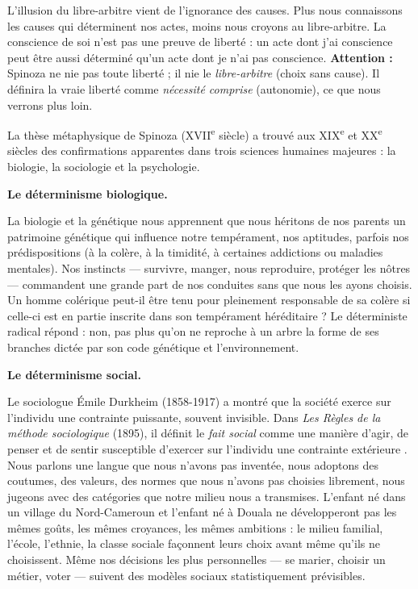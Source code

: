 \documentclass[11pt]{article}
\newcounter{popsec}
\newcounter{popsub}
\newcommand{\courssub}[1]{%
  \stepcounter{popsub}%
  \par\vspace{9pt}\noindent{\popxbold\fontsize{11.5}{13}\selectfont\color{popink}{\color{poporange}\thepopsec.\thepopsub}\hspace{6pt}#1}\par\nopagebreak\vspace{4pt}
}
\begin{document}
\begin{aretenir}
L'illusion du libre-arbitre vient de l'ignorance des causes. Plus nous connaissons les causes qui déterminent nos actes, moins nous croyons au libre-arbitre. La conscience de soi n'est pas une preuve de liberté : un acte dont j'ai conscience peut être aussi déterminé qu'un acte dont je n'ai pas conscience. \textbf{Attention :} Spinoza ne nie pas toute liberté ; il nie le \emph{libre-arbitre} (choix sans cause). Il définira la vraie liberté comme \emph{nécessité comprise} (autonomie), ce que nous verrons plus loin.
\end{aretenir}

\courssub{Les trois grands déterminismes scientifiques}

La thèse métaphysique de Spinoza (XVII\textsuperscript{e} siècle) a trouvé aux XIX\textsuperscript{e} et XX\textsuperscript{e} siècles des confirmations apparentes dans trois sciences humaines majeures : la biologie, la sociologie et la psychologie.

\textbf{Le déterminisme biologique.}\par
La biologie et la génétique nous apprennent que nous héritons de nos parents un patrimoine génétique qui influence notre tempérament, nos aptitudes, parfois nos prédispositions (à la colère, à la timidité, à certaines addictions ou maladies mentales). Nos instincts — survivre, manger, nous reproduire, protéger les nôtres — commandent une grande part de nos conduites sans que nous les ayons choisis. Un homme colérique peut-il être tenu pour pleinement responsable de sa colère si celle-ci est en partie inscrite dans son tempérament héréditaire ? Le déterministe radical répond : non, pas plus qu'on ne reproche à un arbre la forme de ses branches dictée par son code génétique et l'environnement.

\textbf{Le déterminisme social.}\par
Le sociologue Émile Durkheim (1858-1917) a montré que la société exerce sur l'individu une contrainte puissante, souvent invisible. Dans \emph{Les Règles de la méthode sociologique} (1895), il définit le \emph{fait social} comme une manière d'agir, de penser et de sentir \guillemotleft susceptible d'exercer sur l'individu une contrainte extérieure \guillemotright. Nous parlons une langue que nous n'avons pas inventée, nous adoptons des coutumes, des valeurs, des normes que nous n'avons pas choisies librement, nous jugeons avec des catégories que notre milieu nous a transmises. L'enfant né dans un village du Nord-Cameroun et l'enfant né à Douala ne développeront pas les mêmes goûts, les mêmes croyances, les mêmes ambitions : le milieu familial, l'école, l'ethnie, la classe sociale façonnent leurs choix avant même qu'ils ne choisissent. Même nos décisions les plus personnelles — se marier, choisir un métier, voter — suivent des modèles sociaux statistiquement prévisibles.
\end{document}
